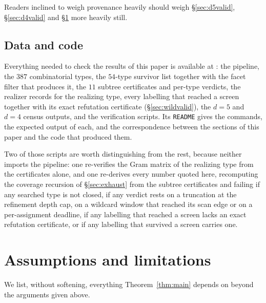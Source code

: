 \documentclass[11pt,reqno]{amsart}
\theoremstyle{plain}
\theoremstyle{definition}
\newcommand{\NumTypes}{387}
\newcommand{\NumSurvivors}{54}
\newcommand{\NumSubtrees}{11}
\begin{document}
Readers inclined to weigh provenance heavily should weigh \S\ref{sec:d5valid},
\S\ref{sec:d4valid} and \S\ref{sec:assumptions} more heavily still.

\subsection{Data and code}
\label{sec:datacode}
Everything needed to check the results of this paper is available at \cite{Repo}:
the pipeline, the $\NumTypes$ combinatorial types, the $\NumSurvivors$-type
survivor list together with the facet filter that produces it, the $\NumSubtrees$
subtree certificates and per-type verdicts, the realizer records for the realizing
type, every labelling that reached a screen together with its exact refutation
certificate (\S\ref{sec:wildvalid}), the $d=5$ and $d=4$ census outputs,
and the verification scripts. Its \texttt{README} gives the commands, the expected
output of each, and the correspondence between the sections of this paper and the
code that produced them.

Two of those scripts are worth distinguishing from the rest, because neither
imports the pipeline: one re-verifies the Gram matrix of the realizing type from
the certificates alone, and one re-derives every number quoted here, recomputing
the coverage recursion of \S\ref{sec:exhaust} from the subtree certificates and
failing if any searched type is not closed, if any verdict rests on a truncation
at the refinement depth cap, on a wildcard window that reached its scan edge or on
a per-assignment deadline, if any labelling that reached a screen lacks an exact
refutation certificate, or if any labelling that survived a screen carries one.

\section{Assumptions and limitations}
\label{sec:assumptions}

We list, without softening, everything Theorem~\ref{thm:main} depends on beyond
the arguments given above.
\end{document}
